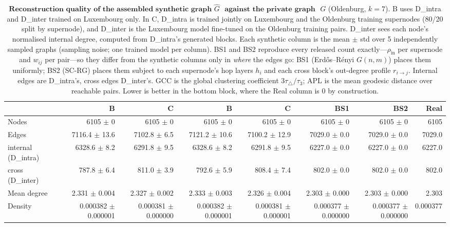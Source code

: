 \begin{table}[H]
\centering
\caption{$\textbf{Reconstruction quality of the assembled synthetic graph}$
$\widehat{G}$ $\textbf{ against the private graph }$ $G$ (Oldenburg, $k{=}7$).
B uses D\_intra and D\_inter trained on Luxembourg only. In C, D\_intra is trained jointly on Luxembourg and the Oldenburg training supernodes (80/20 split by supernode), and D\_inter is the Luxembourg model fine-tuned on the Oldenburg training pairs. D\_inter sees each node's normalised internal degree, computed from D\_intra's generated blocks. Each synthetic column is the
mean $\pm$ std over 5 independently sampled graphs (sampling noise; one trained
model per column). BS1 and BS2 reproduce every released count exactly---$\rho_{\mathrm{in}}$
per supernode and $w_{ij}$ per pair---so they differ from the synthetic columns
only in \emph{where} the edges go: BS1 (Erd\H{o}s--R\'enyi $G(n,m)$) places them
uniformly; BS2 (SC-RG) places them subject to each supernode's hop layers $h_i$ and
each cross block's out-degree profile $r_{i\to j}$. Internal edges are D\_intra's, cross edges
D\_inter's. GCC is the global clustering coefficient $3\tau_{\triangle}/\tau_{3}$;
APL is the mean geodesic distance over reachable pairs. Lower is better in the
bottom block, where the Real column is $0$ by construction.}
\label{tab:lsyn-oldenburg-k7}
\begin{tabular}{lrrrrrrr}
\toprule
 & B & C & B & C & BS1 & BS2 & Real \\
\midrule
Nodes                         & 6105 $\pm$ 0 & 6105 $\pm$ 0 & 6105 $\pm$ 0 & 6105 $\pm$ 0 & 6105 $\pm$ 0 & 6105 $\pm$ 0 & 6105 \\
Edges                         & 7116.4 $\pm$ 13.6 & 7102.8 $\pm$ 6.5 & 7121.2 $\pm$ 10.6 & 7100.2 $\pm$ 12.9 & 7029.0 $\pm$ 0.0 & 7029.0 $\pm$ 0.0 & 7029.0 \\
\quad internal (D\_intra)     & 6328.6 $\pm$ 8.2 & 6291.8 $\pm$ 9.5 & 6328.6 $\pm$ 8.2 & 6291.8 $\pm$ 9.5 & 6227.0 $\pm$ 0.0 & 6227.0 $\pm$ 0.0 & 6227.0 \\
\quad cross (D\_inter)        & 787.8 $\pm$ 6.4 & 811.0 $\pm$ 3.9 & 792.6 $\pm$ 5.9 & 808.4 $\pm$ 7.4 & 802.0 $\pm$ 0.0 & 802.0 $\pm$ 0.0 & 802.0 \\
Mean degree                   & 2.331 $\pm$ 0.004 & 2.327 $\pm$ 0.002 & 2.333 $\pm$ 0.003 & 2.326 $\pm$ 0.004 & 2.303 $\pm$ 0.000 & 2.303 $\pm$ 0.000 & 2.303 \\
Density                       & 0.000382 $\pm$ 0.000001 & 0.000381 $\pm$ 0.000000 & 0.000382 $\pm$ 0.000001 & 0.000381 $\pm$ 0.000001 & 0.000377 $\pm$ 0.000000 & 0.000377 $\pm$ 0.000000 & 0.000377 \\

\end{tabular}
\end{table}
